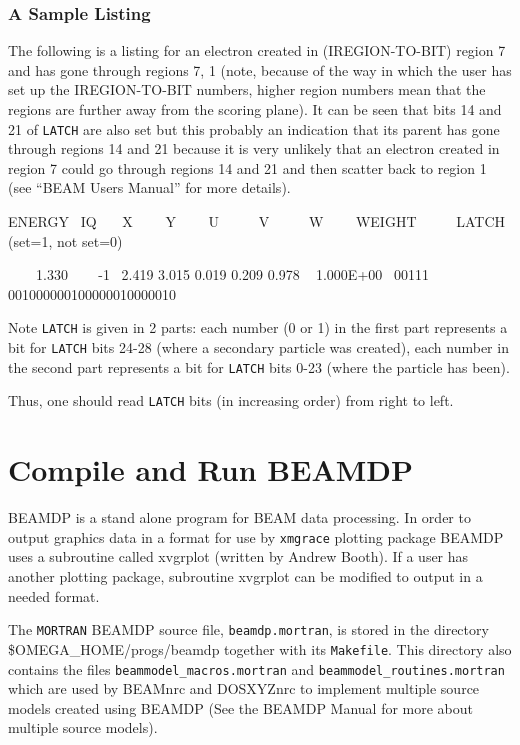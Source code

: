 \documentclass[12pt,twoside]{article}
\begin{document}
\subsubsection{ A Sample Listing}
The following is a listing for an electron created in (IREGION-TO-BIT)
region 7 and has gone through regions 7, 1 (note, because of the way in
which the user has set up the IREGION-TO-BIT numbers, higher region numbers
mean that the regions are further away from the scoring plane). It can be
seen that bits 14 and 21 of \verb+LATCH+ are also set but this probably an
indication that its parent has gone through regions 14 and 21 because it
is very unlikely that an electron created in region 7 could go through
regions 14 and 21 and then scatter back to region 1 (see ``BEAM Users
Manual'' for more details).


\noindent
 ENERGY   ~IQ  ~~~X  ~~~~Y  ~~~~U      ~~~~~V      ~~~~~W     ~~~~WEIGHT       ~~~~~LATCH (set=1, not set=0)

\noindent
  ~~~~1.330 ~~~ -1   ~2.419   3.015  0.019  0.209  0.978  ~ 1.000E+00  ~00111 001000000100000010000010


\noindent
Note \verb+LATCH+ is given in 2 parts: each number (0 or 1) in the first part
represents a bit for \verb+LATCH+ bits 24-28 (where a secondary particle
was created), each number in the second part represents a bit for
\verb+LATCH+ bits 0-23 (where the particle has been).

Thus, one should read \verb+LATCH+ bits (in increasing order) from right
to left.


\section{Compile and Run BEAMDP}
BEAMDP is a stand alone program for BEAM data processing. In order to
output graphics data in a format for use by \verb+xmgrace+ plotting package
BEAMDP
uses a subroutine called xvgrplot (written by Andrew Booth). If a user has
another plotting package, subroutine xvgrplot can be modified to output in a
needed format.


The {\tt MORTRAN} BEAMDP source file, {\tt beamdp.mortran}, is stored in the
directory\\
\$OMEGA\_HOME/progs/beamdp together with its {\tt Makefile}.  This directory
also contains the files {\tt beammodel\_macros.mortran} and
{\tt beammodel\_routines.mortran} which are used by BEAMnrc\cite{Ro04a}
 and DOSXYZnrc\cite{WR04a} to implement multiple source models created
using BEAMDP (See the BEAMDP Manual\cite{MR04a} for more about multiple
source models).
\end{document}
